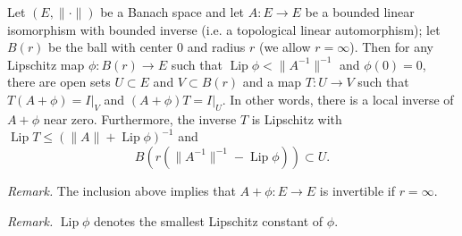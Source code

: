 \documentclass[12pt]{article}
\newcommand{\lip}{\operatorname{Lip}}
\begin{document}
Let $(E,\|\cdot\|)$ be a Banach space and let $A\colon E\to E$ be a
bounded linear isomorphism with
bounded inverse (i.e. a topological linear automorphism);
let $B(r)$ be the ball with center 0
and radius $r$ (we allow $r=\infty$). Then for any Lipschitz map
$\phi\colon B(r)\to E$
such that $\lip \phi < \|A^{-1}\|^{-1}$ and $\phi(0)=0$, there are open sets
$U\subset E$ and $V\subset B(r)$ and a map $T \colon U\to V$ such that $T(A+\phi) = I|_V$ and $(A+\phi)T = I|_U$.
In other words, there is a local inverse of $A+\phi$ near zero. Furthermore, the inverse $T$ is Lipschitz with $\lip T \leq (\|A\|+\lip \phi)^{-1}$ and
$$B\left(r(\|A^{-1}\|^{-1} - \lip \phi)\right)\subset U.$$

\emph{Remark.} The inclusion above implies that $A+\phi\colon E\to E$ is invertible if $r=\infty$.

\emph{Remark.} $\lip \phi$ denotes the smallest Lipschitz constant of $\phi$.
\end{document}
